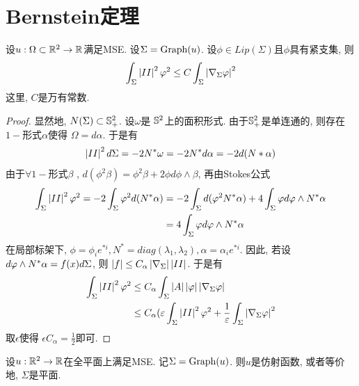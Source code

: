 \section{Bernstein定理}
\begin{proposition} \label{caccio}
    设$u: \Omega \subset \R^2 \to \R$满足MSE. 设$\Sigma=\G(u)$. 设$\phi \in Lip(\Sigma)$且$\phi$具有紧支集, 则
    \begin{equation}
        \int_{\Sigma}\abs{II}^2\phi^2 \le C\int_\Sigma \abs{\nabla_{\Sigma}\phi}^2
    \end{equation}
    这里,  $C$是万有常数.
\end{proposition}
\begin{proof}
    显然地, $\N(\Sigma) \subset \S^2_+$. 设$\omega$是 $\S^2$上的面积形式. 由于$\S^2_+$是单连通的, 则存在$1-$形式$\alpha$使得  $\Omega=d\alpha$. 于是有 
    \begin{equation}
        \abs{II}^2d\Sigma=-2\N^*\omega=-2\N^*d\alpha=-2d(\N*\alpha)
    \end{equation}
    由于$\forall 1-$形式$\beta$ , $d(\phi^2\beta)=\phi^2\beta+2\phi d\phi\wedge\beta$, 再由Stokes公式
    \begin{equation}
        \begin{split}
            \int_\Sigma \abs{II}^2\phi^2 = -2 \int_\Sigma \phi^2 d(\N^*\alpha) &=-2\int_\Sigma d(\phi^2\N^*\alpha)+4\int_\Sigma \phi d\phi\wedge N^*\alpha\\
            &= 4\int_\Sigma  \phi d\phi\wedge N^*\alpha
        \end{split}
    \end{equation}
    在局部标架下, $\phi=\phi_i e^{*i}, N^*=diag(\lambda_1,\lambda_2), \alpha=\alpha_i e^{*i}$. 因此, 若设 $d\phi\wedge \N^*\alpha= f(x)d\Sigma$, 则 $\abs{f} \le C_\alpha \abs{\nabla_\Sigma}\abs{II}$. 于是有
    \begin{equation}
        \begin{split}
            \int_\Sigma \abs{II}^2\phi^2 &\le C_\alpha \int_\Sigma \abs{A}\abs{\phi} \abs{\nabla_\Sigma \phi} \\
            & \le C_\alpha(\epsilon \int_\Sigma \abs{II}^2\phi^2 + \frac{1}{\epsilon}\int_\Sigma  \abs{\nabla_\Sigma \phi}^2 \\
        \end{split}
    \end{equation}
    取$\epsilon$使得 $\epsilon C_\alpha=\frac{1}{2}$即可.
\end{proof}
\begin{theorem}
    设$u: \R^2 \to \R$在全平面上满足MSE.  记$\Sigma=\G(u)$. 则$u$是仿射函数, 或者等价地, $\Sigma$是平面.
\end{theorem}
